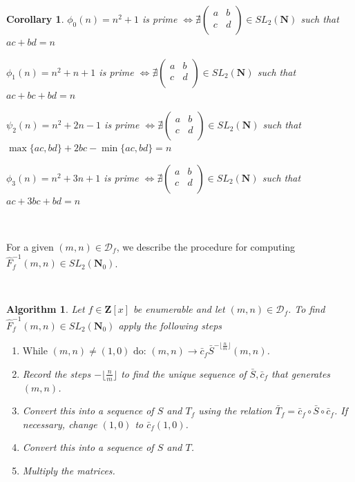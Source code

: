 \documentclass{article}
\newtheorem{algorithm}[theorem]{Algorithm}  %
\newtheorem{corollary}[theorem]{Corollary}  %
\begin{document}
\begin{corollary}
    \item $\phi_0(n) = n^2 + 1$ is prime $\iff \nexists \begin{pmatrix} a & b \\
    c & d \\
    \end{pmatrix} \in SL_2(\mathbf{N})$ such that $ac + bd = n$ \\
    \item $\phi_1(n) = n^2 + n + 1$ is prime $\iff \nexists \begin{pmatrix} a & b \\
    c & d \\
    \end{pmatrix} \in SL_2(\mathbf{N})$ such that $ac + bc + bd = n$ \\
    \item $\psi_2(n) = n^2 + 2n - 1$ is prime $\iff \nexists \begin{pmatrix} a & b \\
    c & d \\
    \end{pmatrix} \in SL_2(\mathbf{N})$ such that $\max \{ac, bd\} +2bc - \min \{ac, bd\} = n$ \\
    \item $\phi_3(n) = n^2 + 3n + 1$ is prime $\iff \nexists \begin{pmatrix} a & b \\
    c & d \\
    \end{pmatrix} \in SL_2(\mathbf{N})$ such that $ac + 3bc + bd = n$ \\


\end{corollary}

\

For a given $(m, n) \in \mathcal{D}_f$, we describe the procedure for computing $\hat{F}_f^{-1}(m, n) \in SL_2(\mathbf{N}_0)$.

\

\begin{algorithm}\label{algorithm}\label{computinginverses}
Let $f \in \mathbf{Z}[x]$ be enumerable and let $(m,n) \in \mathcal{D}_f$. To find $\hat{F}_f^{-1}(m, n) \in SL_2(\mathbf{N}_0)$ apply the following steps

\begin{enumerate}
    \item $\text{While } (m, n) \neq (1,0) \text{ do:  } (m,n) \rightarrow \bar{c}_f\bar{S}^{- \lfloor \frac{n}{m} \rfloor}(m, n)$.
    \item Record the steps $- \lfloor \frac{n}{m} \rfloor$ to find the unique sequence of $\bar{S}, \bar{c}_f$ that generates $(m,n)$.
    \item Convert this into a sequence of $S$ and $T_f$ using the relation $\bar{T}_f = \bar{c}_f \circ \bar{S} \circ \bar{c}_f$. If necessary, change $(1,0)$ to $\bar{c}_f(1,0)$.
    \item Convert this into a sequence of $S$ and $T$.
    \item Multiply the matrices.
\end{enumerate}

\end{algorithm}
\end{document}
